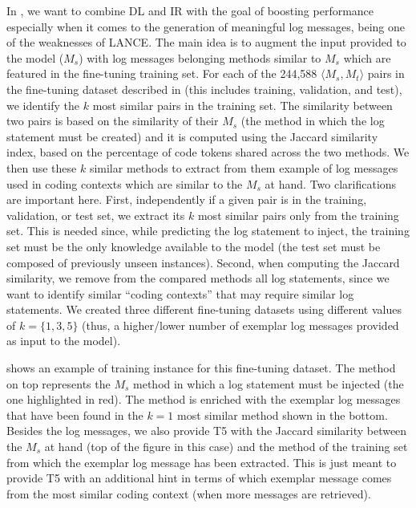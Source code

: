 In \approach, we want to combine DL and IR with the goal of boosting performance especially when it comes to the generation of meaningful log messages, being one of the weaknesses of LANCE. The main idea is to augment the input provided to the model (\ie $M_{s}$) with log messages belonging methods similar to $M_{s}$ which are featured in the fine-tuning training set. For each of the 244,588 $\langle M_s, M_t \rangle$ pairs in the fine-tuning dataset described in  (this includes training, validation, and test), we identify the $k$ most similar pairs in the training set. The similarity between two pairs is based on the similarity of their $M_s$ (\ie the method in which the log statement must be created) and it is computed using the Jaccard similarity \cite{hancock2004jaccard} index, based on the percentage of code tokens shared across the two methods. We then use these $k$ similar methods to extract from them example of log messages used in coding contexts which are similar to the $M_s$ at hand. Two clarifications are important here. First, independently if a given pair is in the training, validation, or test set, we extract its $k$ most similar pairs only from the training set. This is needed since, while predicting the log statement to inject, the training set must be the only knowledge available to the model (\ie the test set must be composed of previously unseen instances). Second, when computing the Jaccard similarity, we remove from the compared methods all log statements, since we want to identify similar ``coding contexts'' that may require similar log statements. We created three different fine-tuning datasets using different values of $k=\{1,3,5\}$ (thus, a higher/lower number of exemplar log messages provided as input to the model).




 shows an example of training instance for this fine-tuning dataset. The method on top represents the $M_{s}$ \java method in which a log statement must be injected (\ie the one highlighted in red). The method is enriched with the exemplar log messages that have been found in the $k=1$ most similar method shown in the bottom. Besides the log messages, we also provide T5 with the Jaccard similarity between the $M_{s}$ at hand (top of the figure in this case) and the method of the training set from which the exemplar log message has been extracted. This is just meant to provide T5 with an additional hint in terms of which exemplar message comes from the most similar coding context (when more messages are retrieved).

